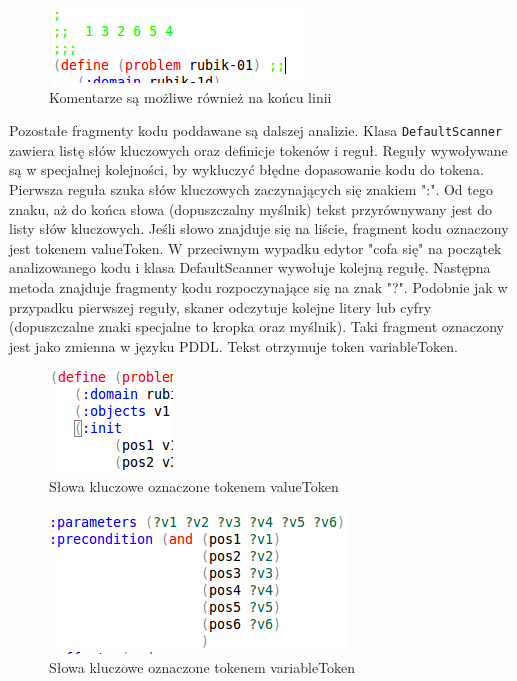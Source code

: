 \begin{figure}[h]
  \centering
    \includegraphics{img/comments.png}
    \caption{Komentarze są możliwe również na końcu linii}
    \label{ana_structure}
\end{figure}
Pozostałe fragmenty kodu poddawane są dalszej analizie. Klasa \texttt{DefaultScanner} zawiera listę słów kluczowych oraz definicje tokenów i reguł. Reguły wywoływane są w specjalnej kolejności, by wykluczyć błędne dopasowanie kodu do tokena. Pierwsza reguła szuka słów kluczowych zaczynających się znakiem ":".  Od tego znaku, aż do końca słowa (dopuszczalny myślnik) tekst przyrównywany jest do listy słów kluczowych. Jeśli słowo znajduje się na liście, fragment kodu oznaczony jest tokenem valueToken.
 W przeciwnym wypadku edytor "cofa się" na początek analizowanego kodu i klasa DefaultScanner wywołuje kolejną regułę. Następna metoda znajduje fragmenty kodu rozpoczynające się na znak "?".  Podobnie jak w przypadku pierwszej reguły, skaner odczytuje kolejne litery lub cyfry (dopuszczalne znaki specjalne to kropka oraz myślnik). Taki fragment oznaczony jest jako zmienna w języku PDDL. Tekst otrzymuje token variableToken.
\begin{figure}[h]
  \centering
    \includegraphics{img/values-color.png}
    \caption{Słowa kluczowe oznaczone tokenem valueToken}
    \label{ana_structure}
\end{figure}
\begin{figure}[h]
  \centering
    \includegraphics{img/variable-color.png}
    \caption{Słowa kluczowe oznaczone tokenem variableToken}
    \label{ana_structure}
\end{figure}
